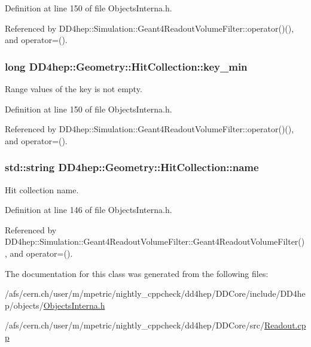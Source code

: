 Definition at line 150 of file ObjectsInterna.h.

Referenced by DD4hep::Simulation::Geant4ReadoutVolumeFilter::operator()(), and operator=().\hypertarget{class_d_d4hep_1_1_geometry_1_1_hit_collection_a34a3fcd70ef34e2b1ecb877805a0f682}{
\subsubsection[{key\_\-min}]{\setlength{\rightskip}{0pt plus 5cm}long {\bf DD4hep::Geometry::HitCollection::key\_\-min}}}
\label{class_d_d4hep_1_1_geometry_1_1_hit_collection_a34a3fcd70ef34e2b1ecb877805a0f682}


Range values of the key is not empty. 

Definition at line 150 of file ObjectsInterna.h.

Referenced by DD4hep::Simulation::Geant4ReadoutVolumeFilter::operator()(), and operator=().\hypertarget{class_d_d4hep_1_1_geometry_1_1_hit_collection_a9c9a772a612f38f6104fd976f8b20ba0}{
\subsubsection[{name}]{\setlength{\rightskip}{0pt plus 5cm}std::string {\bf DD4hep::Geometry::HitCollection::name}}}
\label{class_d_d4hep_1_1_geometry_1_1_hit_collection_a9c9a772a612f38f6104fd976f8b20ba0}


Hit collection name. 

Definition at line 146 of file ObjectsInterna.h.

Referenced by DD4hep::Simulation::Geant4ReadoutVolumeFilter::Geant4ReadoutVolumeFilter(), and operator=().

The documentation for this class was generated from the following files:\begin{DoxyCompactItemize}
\item 
/afs/cern.ch/user/m/mpetric/nightly\_\-cppcheck/dd4hep/DDCore/include/DD4hep/objects/\hyperlink{_objects_interna_8h}{ObjectsInterna.h}\item 
/afs/cern.ch/user/m/mpetric/nightly\_\-cppcheck/dd4hep/DDCore/src/\hyperlink{_readout_8cpp}{Readout.cpp}\end{DoxyCompactItemize}
